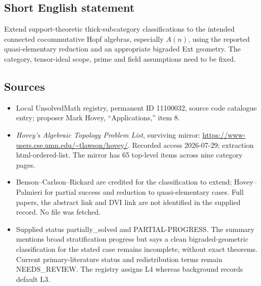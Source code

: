 \documentclass[11pt]{article}
\begin{document}
\subsection{Short English statement}
Extend support-theoretic thick-subcategory classifications to the intended connected cocommutative Hopf algebras, especially \(A(n)\), using the reported quasi-elementary reduction and an appropriate bigraded Ext geometry. The category, tensor-ideal scope, prime and field assumptions need to be fixed.
\subsection{Sources}
\begin{itemize}
\item Local UnsolvedMath registry, permanent ID 11100032, source code catalogue entry; proposer Mark Hovey, ``Applications,'' item 8.
\item \emph{Hovey's Algebraic Topology Problem List}, surviving mirror: \url{https://www-users.cse.umn.edu/~tlawson/hovey/}. Recorded access 2026-07-29; extraction html-ordered-list. The mirror has 65 top-level items across nine category pages.
\item Benson--Carlson--Rickard are credited for the classification to extend; Hovey--Palmieri for partial success and reduction to quasi-elementary cases. Full papers, the abstract link and DVI link are not identified in the supplied record. No file was fetched.
\item Supplied status partially\_solved and PARTIAL-PROGRESS. The summary mentions broad stratification progress but says a clean bigraded-geometric classification for the stated case remains incomplete, without exact theorems. Current primary-literature status and redistribution terms remain NEEDS\_REVIEW. The registry assigns L4 whereas background records default L3.
\end{itemize}
\end{document}
